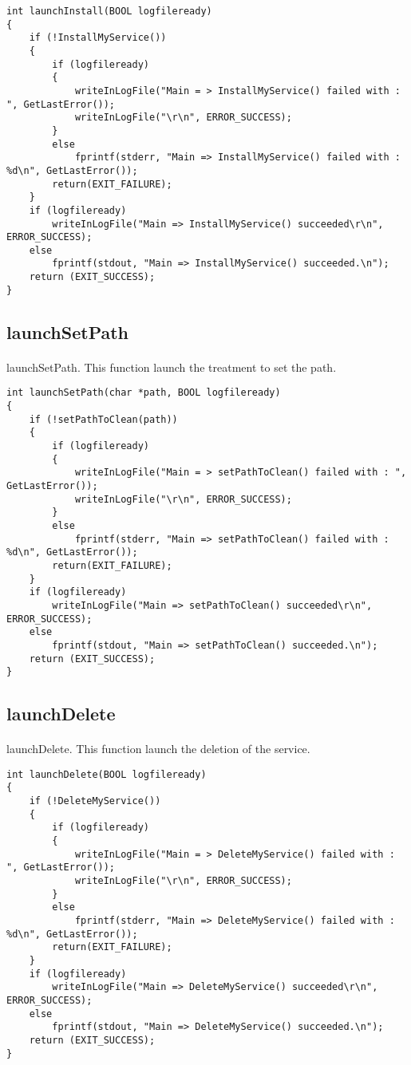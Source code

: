 \documentclass{article}
\begin{document}
\begin{lstlisting}
int launchInstall(BOOL logfileready)
{
	if (!InstallMyService())
	{
		if (logfileready)
		{
			writeInLogFile("Main = > InstallMyService() failed with : ", GetLastError());
			writeInLogFile("\r\n", ERROR_SUCCESS);
		}
		else
			fprintf(stderr, "Main => InstallMyService() failed with : %d\n", GetLastError());
		return(EXIT_FAILURE);
	}
	if (logfileready)
		writeInLogFile("Main => InstallMyService() succeeded\r\n", ERROR_SUCCESS);
	else
		fprintf(stdout, "Main => InstallMyService() succeeded.\n");
	return (EXIT_SUCCESS);
}
\end{lstlisting}

\subsection{launchSetPath}
\paragraph{}
launchSetPath. This function launch the treatment to set the path.

\begin{lstlisting}
int	launchSetPath(char *path, BOOL logfileready)
{
	if (!setPathToClean(path))
	{
		if (logfileready)
		{
			writeInLogFile("Main = > setPathToClean() failed with : ", GetLastError());
			writeInLogFile("\r\n", ERROR_SUCCESS);
		}
		else
			fprintf(stderr, "Main => setPathToClean() failed with : %d\n", GetLastError());
		return(EXIT_FAILURE);
	}
	if (logfileready)
		writeInLogFile("Main => setPathToClean() succeeded\r\n", ERROR_SUCCESS);
	else
		fprintf(stdout, "Main => setPathToClean() succeeded.\n");
	return (EXIT_SUCCESS);
}
\end{lstlisting}

\newpage
\subsection{launchDelete}
\paragraph{}
launchDelete. This function launch the deletion of the service.

\begin{lstlisting}
int	launchDelete(BOOL logfileready)
{
	if (!DeleteMyService())
	{
		if (logfileready)
		{
			writeInLogFile("Main = > DeleteMyService() failed with : ", GetLastError());
			writeInLogFile("\r\n", ERROR_SUCCESS);
		}
		else
			fprintf(stderr, "Main => DeleteMyService() failed with : %d\n", GetLastError());
		return(EXIT_FAILURE);
	}
	if (logfileready)
		writeInLogFile("Main => DeleteMyService() succeeded\r\n", ERROR_SUCCESS);
	else
		fprintf(stdout, "Main => DeleteMyService() succeeded.\n");
	return (EXIT_SUCCESS);
}
\end{lstlisting}
\end{document}

